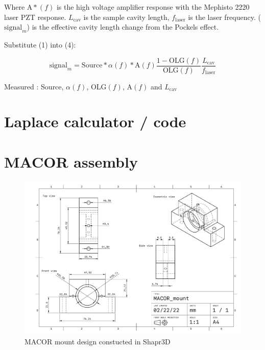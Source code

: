 Where $\mathrm{A}*(f)$ is the high voltage amplifier response with the Mephisto 2220 laser PZT response. $L_\mathrm{cav}$ is the sample cavity length, $f_\mathrm{laser}$ is the laser frequency. ($\mathrm{signal}_m$)  is the effective cavity length change from the Pockels effect.

Substitute (1) into (4):

\begin{equation}
\mathrm{signal}_m = \mathrm{Source} * \alpha(f) * \mathrm{A}(f) \frac{1-\mathrm{OLG}(f)}{\mathrm{OLG}(f)} \frac{L_\mathrm{cav}}{f_\mathrm{laser}}
\end{equation}

Measured :
Source, $\alpha (f)$, OLG$(f)$, A$(f)$ and $L_\mathrm{cav}$

\section{Laplace calculator / code}

\section{MACOR assembly}

\begin{figure}[H]
\includegraphics[width=\textwidth]{figs/ALGAAS/MACOR_mount.pdf}
\caption{MACOR mount design constucted in Shapr3D}


\label{fig:macor_mount_design}
\end{figure}

